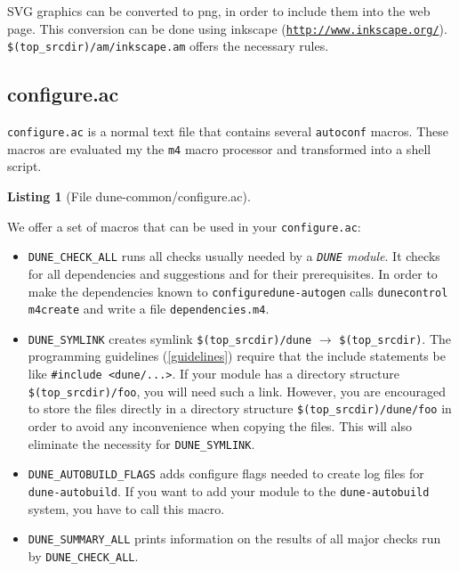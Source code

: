 \documentclass[11pt,a4paper,headinclude,footinclude,DIV16,normalheadings]{scrartcl}
\newtheorem{lst}{Listing}
\newcommand{\dune}{\texttt{DUNE}\xspace}
\newcommand{\autoconf}{\texttt{autoconf}\xspace}
\newcommand{\autogen}{\texttt{dune-autogen}\xspace}
\newcommand{\configure}{\texttt{configure}\xspace}
\newcommand{\configureac}{\texttt{configure.ac}\xspace}
\newcommand{\topsrc}{\$(top\_srcdir)}
\begin{document}
SVG graphics can be converted to png, in order to include them into
the web page. This conversion can be done using inkscape
(\texttt{\url{http://www.inkscape.org/}}).
\texttt{\$(top\_srcdir)/am/inkscape.am} offers the necessary rules.


\subsection{configure.ac}
\label{configure.ac}

\configureac  is a normal text file that contains several \autoconf
macros. These macros are evaluated my the \texttt{m4} macro processor
and transformed into a shell script.

\begin{lst}[File dune-common/configure.ac] \mbox{}

\end{lst}

We offer a set of macros that can be used in your \configureac:

\begin{itemize}
\item \texttt{DUNE\_CHECK\_ALL}
  runs all checks usually needed by a {\em \dune module}.
  It checks for all dependencies and suggestions and for their
  prerequisites.
  In order to make the dependencies known to \configure \autogen calls
  \texttt{dunecontrol m4create} and write a file
  \texttt{dependencies.m4}.
\item \texttt{DUNE\_SYMLINK}
  creates symlink \texttt{\$(top\_srcdir)/dune} $\rightarrow$
  \texttt{\$(top\_srcdir)}. The programming guidelines (\ref{guidelines})
  require that the include statements be like \texttt{\#include
    <dune/...>}. If your module has a directory structure
  \texttt{\topsrc/foo}, you will need such a link. However, you are
  encouraged to store the files directly in a directory structure
  \texttt{\topsrc/dune/foo} in order to avoid any inconvenience when
  copying the files. This will also eliminate the necessity for
  \texttt{DUNE\_SYMLINK}.
\item \texttt{DUNE\_AUTOBUILD\_FLAGS}
  adds configure flags needed to create log files for
  \texttt{dune-autobuild}. If you want to add your module to the
  \texttt{dune-autobuild} system, you have to call this macro.
\item \texttt{DUNE\_SUMMARY\_ALL}
  prints information on the results of all major checks run by
  \texttt{DUNE\_CHECK\_ALL}.
\end{itemize}
\end{document}
